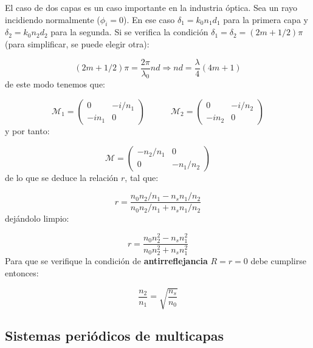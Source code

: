 \documentclass[12pt,a4paper]{book}
\numberwithin{equation}{section}
\numberwithin{figure}{section}
\newcommand{\tquad}{\quad \quad \quad}
\newcommand{\parentesis}[1]{\left( #1  \right)}
\newcommand{\1}{_{(1)}}
\newcommand{\2}{_{(2)}}
\theoremstyle{definition}
\begin{document}

\hrulefill


El caso de dos capas es un caso importante en la industria óptica. Sea un rayo incidiendo normalmente ($\phi_i=0$). En ese caso $\delta_1 = k_0 n_1 d_1$ para la primera capa y $\delta_2=k_0n_2d_2$ para la segunda. Si se verifica la condición $\delta_1=\delta_2=(2m+1/2)\pi$ (para simplificar, se puede elegir otra):

\begin{equation}
(2m+1/2)\pi = \frac{2\pi}{\lambda_0} n d \Longrightarrow nd= \frac{\lambda}{4} \parentesis{4m+1} 
\end{equation}
de este modo tenemos que:

\begin{equation}
\mathcal{M}_1 =  \begin{pmatrix}
0 & -i/n_1 \\
-i n_1 & 0
\end{pmatrix} \tquad 
\mathcal{M}_2 = \begin{pmatrix}
0 & -i/n_2 \\ 
- i n_2 & 0
\end{pmatrix}
\end{equation}
y por tanto:

\begin{equation}
\mathcal{M} = \begin{pmatrix}
-n_2/n_1 & 0 \\
0 & -n_1/n_2
\end{pmatrix}
\end{equation}
de lo que se deduce la relación $r$, tal que:

$$r = \frac{n_0 n_2/n_1-n_sn_1/n_2}{n_0 n_2/n_1 +n_s n_1/n_2 }$$
dejándolo limpio:

\begin{equation}
r=\frac{n_0n_2^2-n_sn_1^2}{n_0n_2^2+n_sn_1^2}
\end{equation}
Para que se verifique la condición de \textbf{antirreflejancia} $R=r=0$ debe cumplirse entonces:

\begin{equation}
\frac{n_2}{n_1} = \sqrt{\frac{n_s}{n_0}}
\end{equation}


\hrulefill


\subsection{Sistemas periódicos de multicapas}
\end{document}
